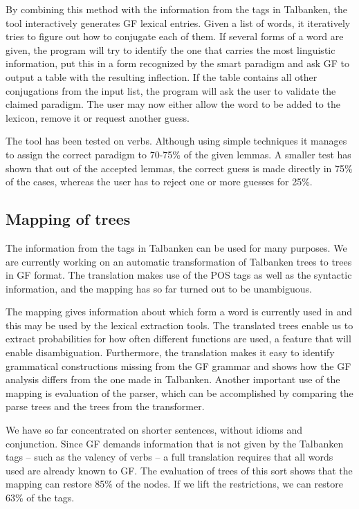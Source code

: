 \documentclass[submission]{eptcs} %
\begin{document}
By combining this method with the information from the tags in Talbanken,
the tool interactively generates GF lexical entries. 
Given a list of words, it iteratively
tries to figure out how to conjugate each of them. If several forms of a word are 
given, the program will try to identify the one that carries the most linguistic
information, put this in a form recognized by the smart paradigm and ask GF to output
a table with the resulting inflection. 
If the table contains all other conjugations from the input list,
the program will ask the  user to
validate the claimed paradigm. The user may now either
allow the word to be added to the lexicon, remove it or request another guess.

The tool has been tested on verbs. Although using simple techniques it 
manages to assign the correct paradigm to 70-75\% of the given lemmas.
A smaller test has shown that out of the accepted lemmas, the correct guess is
made directly in 75\% of the cases, whereas the user has to reject one or more
guesses for 25\%. 


\subsection{Mapping of trees}
The information from the tags in Talbanken can be used for many purposes.
We are currently working on an automatic transformation of Talbanken trees 
to trees in GF format. The translation makes use of the POS tags as well as
the syntactic information, and the mapping has so far turned out to be unambiguous. 

The mapping gives information about which form a word is
currently used in and this may be used by the lexical extraction
tools.
The translated trees enable us to extract probabilities for how often
different functions are used, a feature that will enable disambiguation.
Furthermore, the translation makes it easy to identify grammatical constructions
missing from the GF grammar and shows how the GF analysis differs from the one made
in Talbanken.
Another important use of the mapping is evaluation of the parser, which can be
accomplished by comparing the parse trees and the trees from the transformer.

We have so far concentrated on shorter sentences, without idioms and
conjunction. 
Since GF demands information 
that is not given by the Talbanken tags -- such as the valency of verbs -- a
full translation requires that all words used are already known to GF. 
The evaluation of trees of this sort shows that the mapping
can restore 85\% of the nodes. 
If we lift the restrictions, we can restore 63\% of the tags.
\end{document}
